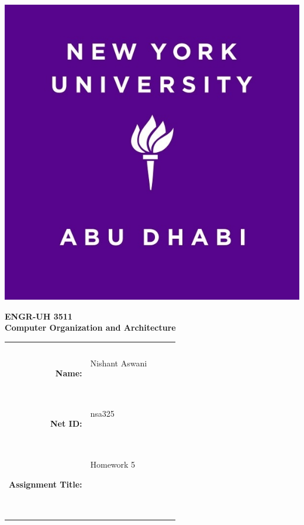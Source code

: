 \documentclass[11pt]{exam}
\newcommand{\myname}{Nishant Aswani}
\newcommand{\mynetid}{nsa325}
\newcommand{\myhwtype}{Homework}
\newcommand{\myhwnum}{5}
\newcommand{\mycoursenumber}{ENGR-UH 3511}
\newcommand{\myclassname}{Computer Organization and Architecture}
\begin{document}
\begin{center}
  \includegraphics[scale=0.15]{etc/NYUAD-alt-logo.jpg}
\end{center}

{\vspace{1.5em}}

\begin{center}
    \Huge{\textbf{\mycoursenumber}}\\
    {\vspace{0.5em}}
    \Huge{\textbf{\myclassname}}
\end{center}

{\vspace{10em}}

\begin{center}
  \begin{tabular}{|rp{5.0cm}lll|}
    \hline
    &  &  &  & \\
    &  &  &  & \\
    \Large{\textbf{Name:}} & \Large{\myname}
    
    \  &  &  & \\
    \Large{\textbf{Net ID:}} & \Large{\mynetid}
    
    \  &  &  & \\
    \Large{\textbf{Assignment Title:}} & \Large{\myhwtype{} \myhwnum}
    
    \
    
    \  &  &  & \\
    \hline
  \end{tabular}
\end{center}
\end{document}
